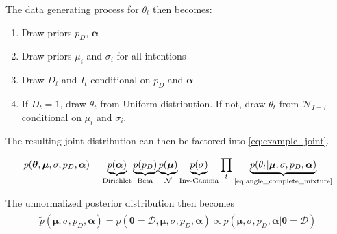 The data generating process for $\theta_t$ then becomes:

\begin{enumerate}
    \item Draw priors $p_D$, $\boldsymbol{\alpha}$ 
    \item Draw priors $\mu_i$ and $\sigma_i$ for all intentions 
    \item Draw $D_t$ and $I_t$ conditional on $p_D$ and $\boldsymbol{\alpha}$
    \item If $D_t=1$, draw $\theta_t$ from Uniform distribution. If not, draw $\theta_t$ from $\mathcal{N}_{I=i}$ conditional on $\mu_i$ and $\sigma_i$.
\end{enumerate}


The resulting joint distribution can then be factored into \cref{eq:example_joint}.

\begin{align}\label{eq:example_joint}
\begin{split}
    p(\boldsymbol{\theta}, \boldsymbol{\mu}, \sigma, p_D, \boldsymbol{\alpha}) =\underbrace{p(\boldsymbol{\alpha})}_{\text{Dirichlet}}\underbrace{p(p_D)}_{\text{Beta}}\underbrace{p(\boldsymbol{\mu})}_{\mathcal{N}} \underbrace{p(\sigma)}_{\text{Inv-Gamma}} \prod_t \underbrace{p(\theta_t | \boldsymbol{\mu}, \sigma, p_D, \boldsymbol{\alpha})}_{\text{\cref{eq:angle_complete_mixture}}}
\end{split}
\end{align}

The unnormalized posterior distribution then becomes
\begin{align}\label{eq:example_unnormalized_posterior}
\begin{split}
    \tilde{p}(\boldsymbol{\mu}, \sigma, p_D, \boldsymbol{\alpha}) =  p(\boldsymbol{\theta} = \mathcal{D}, \boldsymbol{\mu}, \sigma, p_D, \boldsymbol{\alpha}) \propto p(\boldsymbol{\mu}, \sigma, p_D, \boldsymbol{\alpha} | \boldsymbol{\theta}= \mathcal{D})
\end{split}
\end{align}


